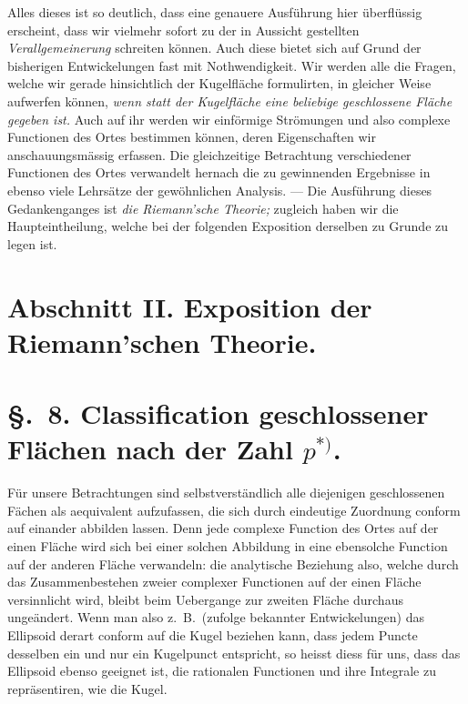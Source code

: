 \documentclass{article}
\begin{document}
Alles dieses ist so deutlich, dass eine genauere Ausführung hier überflüssig erscheint, dass wir vielmehr sofort zu der in Aussicht gestellten \emph{Verallgemeinerung} schreiten können. Auch diese bietet sich auf Grund der bisherigen Entwickelungen fast mit Nothwendigkeit. Wir werden alle die Fragen, welche wir gerade hinsichtlich der Kugelfläche formulirten, in gleicher Weise aufwerfen können, \emph{wenn statt der Kugelfläche eine beliebige geschlossene Fläche gegeben ist.} Auch auf ihr werden wir einförmige Strömungen und also complexe Functionen des Ortes bestimmen können, deren Eigenschaften wir anschauungsmässig erfassen. Die gleichzeitige Betrachtung verschiedener Functionen des Ortes verwandelt hernach die zu gewinnenden Ergebnisse in ebenso viele Lehrsätze der gewöhnlichen Analysis. --- Die Ausführung dieses Gedankenganges ist \emph{die Riemann'sche Theorie;} zugleich haben wir die Haupteintheilung, welche bei der folgenden Exposition derselben zu Grunde zu legen ist.


\section*{Abschnitt II. Exposition der Riemann'schen Theorie.}

\section*{§.~8. Classification geschlossener Flächen nach der Zahl $p$${}^{*)}$.}

Für unsere Betrachtungen sind selbstverständlich alle diejenigen geschlossenen Fächen als aequivalent aufzufassen, die sich durch eindeutige Zuordnung conform auf einander abbilden lassen. Denn jede complexe Function des Ortes auf der einen Fläche wird sich bei einer solchen Abbildung in eine ebensolche Function auf der anderen Fläche verwandeln: die analytische Beziehung also, welche durch das Zusammenbestehen zweier complexer Functionen auf der einen Fläche versinnlicht wird, bleibt beim Uebergange zur zweiten Fläche durchaus ungeändert. Wenn man also z.\ B.\ (zufolge bekannter Entwickelungen) das Ellipsoid derart conform auf die Kugel beziehen kann, dass jedem Puncte desselben ein und nur ein Kugelpunct entspricht, so heisst diess für uns, dass das Ellipsoid ebenso geeignet ist, die rationalen Functionen und ihre Integrale zu repräsentiren, wie die Kugel.
\end{document}
